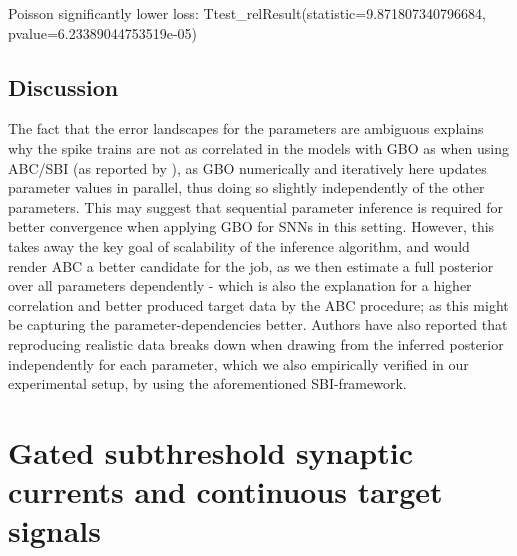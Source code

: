 \documentclass[mphil,deptreport,ianc]{infthesis} %
\begin{document}

Poisson significantly lower loss: Ttest\_relResult(statistic=9.871807340796684, pvalue=6.23389044753519e-05)


\section{Discussion}


The fact that the error landscapes for the parameters are ambiguous explains why the spike trains are not as correlated in the models with GBO as when using ABC/SBI (as reported by \cite{Rene2020}), as GBO numerically and iteratively here updates parameter values in parallel, thus doing so slightly independently of the other parameters. 
This may suggest that sequential parameter inference is required for better convergence when applying GBO for SNNs in this setting.
However, this takes away the key goal of scalability of the inference algorithm, and would render ABC a better candidate for the job, as we then estimate a full posterior over all parameters dependently - which is also the explanation for a higher correlation and better produced target data by the ABC procedure; as this might be capturing the parameter-dependencies better.
Authors have also reported that reproducing realistic data breaks down when drawing from the inferred posterior independently for each parameter, which we also empirically verified in our experimental setup, by using the aforementioned SBI-framework.


\chapter{Gated subthreshold synaptic currents and continuous target signals}
\end{document}
